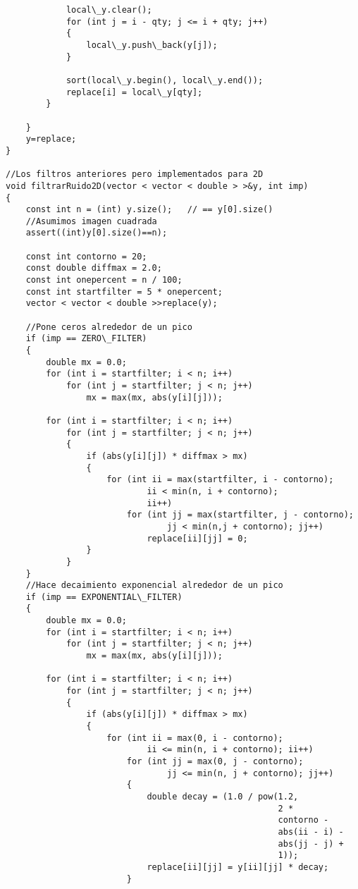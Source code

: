 \begin{lstlisting}
            local\_y.clear();
            for (int j = i - qty; j <= i + qty; j++)
            {
                local\_y.push\_back(y[j]);
            }

            sort(local\_y.begin(), local\_y.end());
            replace[i] = local\_y[qty];
        }

    }
    y=replace;
}

//Los filtros anteriores pero implementados para 2D
void filtrarRuido2D(vector < vector < double > >&y, int imp)
{
    const int n = (int) y.size();	// == y[0].size()
    //Asumimos imagen cuadrada
    assert((int)y[0].size()==n);

    const int contorno = 20;
    const double diffmax = 2.0;
    const int onepercent = n / 100;
    const int startfilter = 5 * onepercent;
    vector < vector < double >>replace(y);

    //Pone ceros alrededor de un pico
    if (imp == ZERO\_FILTER)
    {
        double mx = 0.0;
        for (int i = startfilter; i < n; i++)
            for (int j = startfilter; j < n; j++)
                mx = max(mx, abs(y[i][j]));

        for (int i = startfilter; i < n; i++)
            for (int j = startfilter; j < n; j++)
            {
                if (abs(y[i][j]) * diffmax > mx)
                {
                    for (int ii = max(startfilter, i - contorno);
                            ii < min(n, i + contorno);
                            ii++)
                        for (int jj = max(startfilter, j - contorno);
                                jj < min(n,j + contorno); jj++)
                            replace[ii][jj] = 0;
                }
            }
    }
    //Hace decaimiento exponencial alrededor de un pico
    if (imp == EXPONENTIAL\_FILTER)
    {
        double mx = 0.0;
        for (int i = startfilter; i < n; i++)
            for (int j = startfilter; j < n; j++)
                mx = max(mx, abs(y[i][j]));

        for (int i = startfilter; i < n; i++)
            for (int j = startfilter; j < n; j++)
            {
                if (abs(y[i][j]) * diffmax > mx)
                {
                    for (int ii = max(0, i - contorno);
                            ii <= min(n, i + contorno); ii++)
                        for (int jj = max(0, j - contorno);
                                jj <= min(n, j + contorno); jj++)
                        {
                            double decay = (1.0 / pow(1.2,
                                                      2 *
                                                      contorno -
                                                      abs(ii - i) -
                                                      abs(jj - j) +
                                                      1));
                            replace[ii][jj] = y[ii][jj] * decay;
                        }


\end{lstlisting}
